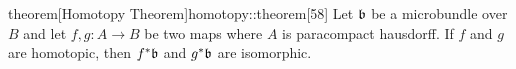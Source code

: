 \begin{mystatement}{theorem}[Homotopy Theorem]{homotopy::theorem}[58]
    Let $\bb$ be a microbundle over $B$ and let $f, g: A \to B$
    be two maps where $A$ is paracompact hausdorff.
    If $f$ and $g$ are homotopic, then $\ind{f}\bb$ and $\ind{g}\bb$ are isomorphic.
\end{mystatement}